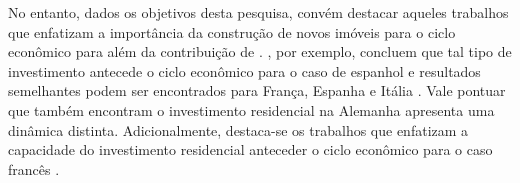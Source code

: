 
No entanto, dados os objetivos desta pesquisa, convém destacar aqueles trabalhos que enfatizam a importância da construção de novos imóveis para o ciclo econômico para além da contribuição de \textcite{leamer_housing_2007}. \textcite{alvarez_does_2010}, por exemplo, concluem que tal tipo de investimento antecede o ciclo econômico para o caso de espanhol e resultados semelhantes podem ser encontrados para França, Espanha  e Itália \cite{ferrara_common_2010}. Vale pontuar que \textcite{ferrara_common_2010} também encontram o investimento residencial na Alemanha apresenta uma dinâmica distinta. Adicionalmente, destaca-se os trabalhos que enfatizam a capacidade do investimento residencial anteceder o ciclo econômico para o caso francês \cite{ferrara_cyclical_2010}. 


